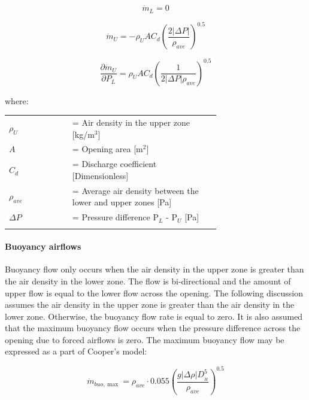 \begin{equation}
\dot{m}_L = 0
\end{equation}

\begin{equation}
\dot{m}_U =  - {\rho_U}A{C_d}{\left( {\frac{{2\left| {\Delta P} \right|}}{{{\rho_{ave}}}}} \right)^{0.5}}
\end{equation}

\begin{equation}
\frac{{\partial \dot{m}_U}}{{\partial {P_L}}} = {\rho_U}A{C_d}{\left( {\frac{1}{{2\left| {\Delta P} \right|{\rho_{ave}}}}} \right)^{0.5}}
\end{equation}

where:

\begin{tabular}{lp{0.7\linewidth}}
\\
$\rho_U$ &= Air density in the upper zone [kg/m\(^{3}\)]\\
$A$ &= Opening area [m\(^{2}\)] \\
$C_{d}$ &= Discharge coefficient [Dimensionless] \\
$\rho_{ave}$ &= Average air density between the lower and upper zones [Pa] \\
$\Delta P$ &= Pressure difference P\(_{L}\) - P\(_{U}\) [Pa] \\
\\
\end{tabular}

\paragraph{Buoyancy airflows}\label{buoyancy-airflows}

Buoyancy flow only occurs when the air density in the upper zone is greater than the air density in the lower zone. The flow is bi-directional and the amount of upper flow is equal to the lower flow across the opening. The following discussion assumes the air density in the upper zone is greater than the air density in the lower zone. Otherwise, the buoyancy flow rate is equal to zero. It is also assumed that the maximum buoyancy flow occurs when the pressure difference across the opening due to forced airflows is zero. The maximum buoyancy flow may be expressed as a part of Cooper's model:

\begin{equation}
\dot{m}_{buo,\max} = {\rho_{ave}}\cdot0.055{\left( {\frac{{g\left| {\Delta \rho } \right|D_{_H}^5}}{{{\rho_{ave}}}}} \right)^{0.5}}
\end{equation}

